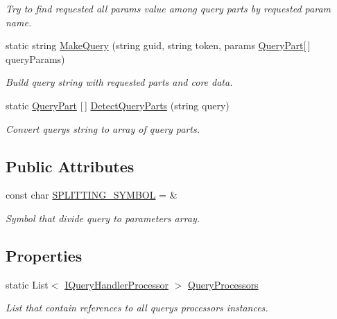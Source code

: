 \begin{DoxyCompactItemize}
\begin{DoxyCompactList}\small\item\em Try to find requested all param\textquotesingle{}s value among query parts by requested param name. \end{DoxyCompactList}\item 
static string \mbox{\hyperlink{class_uniform_queries_1_1_a_p_i_a132ca74ba34302f216b61668dd32a207}{Make\+Query}} (string guid, string token, params \mbox{\hyperlink{struct_uniform_queries_1_1_query_part}{Query\+Part}}\mbox{[}$\,$\mbox{]} query\+Params)
\begin{DoxyCompactList}\small\item\em Build query string with requested parts and core data. \end{DoxyCompactList}\item 
static \mbox{\hyperlink{struct_uniform_queries_1_1_query_part}{Query\+Part}} \mbox{[}$\,$\mbox{]} \mbox{\hyperlink{class_uniform_queries_1_1_a_p_i_a013ca0eff0e67d7f30a6be289312b859}{Detect\+Query\+Parts}} (string query)
\begin{DoxyCompactList}\small\item\em Convert query\textquotesingle{}s string to array of query parts. \end{DoxyCompactList}\end{DoxyCompactItemize}
\subsection*{Public Attributes}
\begin{DoxyCompactItemize}
\item 
const char \mbox{\hyperlink{class_uniform_queries_1_1_a_p_i_aa906970223172f9f2068baa410b621d8}{S\+P\+L\+I\+T\+T\+I\+N\+G\+\_\+\+S\+Y\+M\+B\+OL}} = \textquotesingle{}\&\textquotesingle{}
\begin{DoxyCompactList}\small\item\em Symbol that divide query to parameters array. \end{DoxyCompactList}\end{DoxyCompactItemize}
\subsection*{Properties}
\begin{DoxyCompactItemize}
\item 
static List$<$ \mbox{\hyperlink{interface_uniform_queries_1_1_i_query_handler_processor}{I\+Query\+Handler\+Processor}} $>$ \mbox{\hyperlink{class_uniform_queries_1_1_a_p_i_a8fe90206df6a1ae2b052b82c30a32037}{Query\+Processors}}
\begin{DoxyCompactList}\small\item\em List that contain references to all query\textquotesingle{}s processors instances. \end{DoxyCompactList}\end{DoxyCompactItemize}

